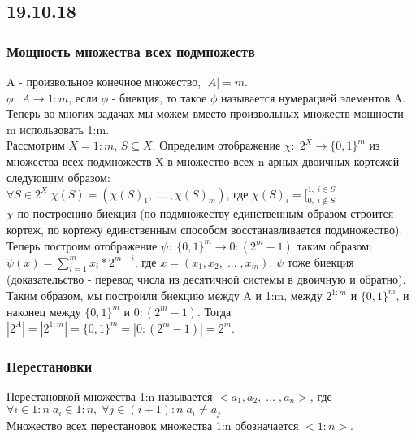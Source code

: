 \subsection{19.10.18}
\subsubsection{Мощность множества всех подмножеств}
A - произвольное конечное множество, $|A| = m$.\\
$\phi : \; A \rightarrow 1:m$, если $\phi$ - биекция, то такое $\phi$ называется нумерацией элементов A.\\
Теперь во многих задачах мы можем вместо произвольных множеств мощности m использовать 1:m.\\
Рассмотрим $X = 1:m$, $S \subseteq X$. Определим отображение $\chi : \; 2^X \rightarrow \{0,1\}^m$ из множества всех подмножеств X в множество всех n-арных двоичных кортежей следующим образом: \\
$\forall S \in 2^X \; \chi(S) = (\chi(S)_1, \; ... \; , \chi(S)_m)$, где $\chi(S)_i = [^{1, \; i \in S}_{0, \; i \not\in S}$\\
$\chi$ по построению биекция (по подмножеству единственным образом строится кортеж, по кортежу единственным способом восстанавливается подмножество). Теперь построим отображение $\psi: \; \{0, 1\}^m \rightarrow 0:(2^m - 1)$ таким образом: $\psi(x) = \sum\limits_{i = 1}^{m}{x_i * 2^{m - i}}$, где $x = (x_1, x_2, \; ... \; , x_m)$. $\psi$ тоже биекция (доказательство - перевод числа из десятичной системы в двоичную и обратно).\\
Таким образом, мы построили биекцию между A и 1:m, между $2^{1:m}$ и $\{0, 1\}^m$, и наконец между $\{0, 1\}^m$ и $0:(2^m - 1)$. Тогда $|2^A| = |2^{1:m}| = \{0, 1\}^m = |0:(2^m - 1)| = 2^m$.
\subsubsection{Перестановки}
Перестановкой множества 1:n называется $<a_1, a_2, \; ... \; , a_n>$, где $\forall i \in 1:n \; a_i \in 1:n, \; \forall j \in (i + 1):n \; a_i \not= a_j$\\
Множество всех перестановок множества 1:n обозначается $<1:n>$.
